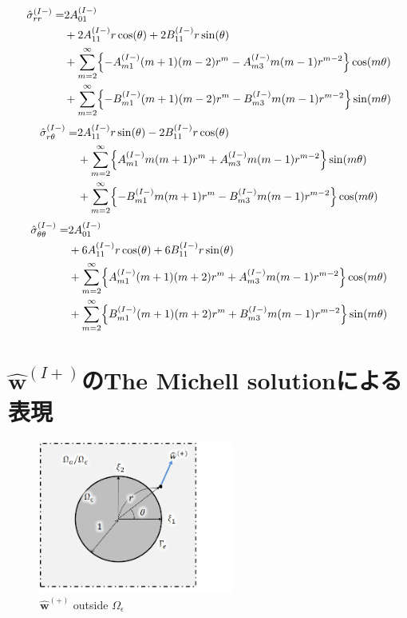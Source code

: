 \begin{align}
	\hat{\sigma}_{rr}^{(I-)} =&2A_{01}^{(I-)}
	\nonumber
	\\
	&+2A_{11}^{(I-)}r\cos(\theta)
	+2B_{11}^{(I-)}r\sin(\theta)
	\nonumber
	\\
	&+\sum_{m=2}^{\infty}\Bigl\{-A_{m1}^{(I-)}(m+1)(m-2)r^{m}
	-A_{m3}^{(I-)}m(m-1)r^{m-2}\Bigr\}\cos(m\theta)
	\nonumber
	\\
	&+\sum_{m=2}^{\infty}\Bigl\{-B_{m1}^{(I-)}(m+1)(m-2)r^{m}
	-B_{m3}^{(I-)}m(m-1)r^{m-2}\Bigr\}\sin(m\theta)
	\label{eq:SigmaRRIn1}
\end{align}
\begin{align}
	\hat{\sigma}_{r\theta}^{(I-)} =
	&2A_{11}^{(I-)}r\sin(\theta)
	-2B_{11}^{(I-)}r\cos(\theta)
	\nonumber
	\\
	&+\sum_{m=2}^{\infty}\Bigl\{A_{m1}^{(I-)}m(m+1)r^{m}
	+A_{m3}^{(I-)}m(m-1)r^{m-2}\Bigr\}\sin(m\theta)
	\nonumber
	\\
	&+\sum_{m=2}^{\infty}\Bigl\{-B_{m1}^{(I-)}m(m+1)r^{m}
	-B_{m3}^{(I-)}m(m-1)r^{m-2}\Bigr\}\cos(m\theta)
	\label{eq:SigmaRThIn1}
\end{align}
\begin{align}
	\hat{\sigma}_{\theta\theta}^{(I-)} =&2A_{01}^{(I-)}
	\nonumber
	\\
	&+6A_{11}^{(I-)}r\cos(\theta)+6B_{11}^{(I-)}r\sin(\theta)
	\nonumber
	\\
	&+\sum_{m=2}^{\infty}\Bigl\{A_{m1}^{(I-)}(m+1)(m+2)r^{m}
	+A_{m3}^{(I-)}m(m-1)r^{m-2}\Bigr\}\cos(m\theta)
	\nonumber
	\\
	&+\sum_{m=2}^{\infty}\Bigl\{B_{m1}^{(I-)}(m+1)(m+2)r^{m}
	+B_{m3}^{(I-)}m(m-1)r^{m-2}\Bigr\}\sin(m\theta)
	\label{eq:SigmaThThIn1}
\end{align}
\newpage

\section{$\hat{\bm{w}}^{(I+)}$のThe Michell solutionによる表現}
\begin{figure}[ht]
	\begin{center}
		\includegraphics[height=5cm]{./figures/OutHole.png}
		\caption{$\hat{\bm{w}}^{(+)}$ outside $\Omega_{\epsilon}$}
		\label{fig:OutHole}
	\end{center}
\end{figure}

